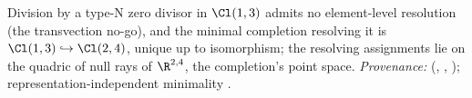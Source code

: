 Division by a type-N zero divisor in $\Cl(1,3)$ admits no element-level resolution (the transvection no-go), and the minimal completion resolving it is $\Cl(1,3) \hookrightarrow \Cl(2,4)$, unique up to isomorphism; the resolving assignments lie on the quadric of null rays of $\R^{2,4}$, the completion's point space. \emph{Provenance:} \cite[Thms.~4.2, 4.10, 4.13]{ButlerT1} (, , ); representation-independent minimality \cite[\S4.6]{ButlerT1}.
